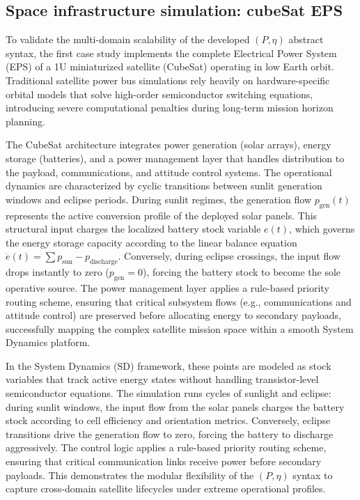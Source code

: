\documentclass[energies,accept,oneauthor,pdftex]{Definitions/mdpi}
\begin{document}
\subsection{Space infrastructure simulation: cubeSat EPS}
To validate the multi-domain scalability of the developed $(P, \eta)$ abstract syntax, the first case study implements the complete Electrical Power System (EPS) of a 1U miniaturized satellite (CubeSat) operating in low Earth orbit. Traditional satellite power bus simulations rely heavily on hardware-specific orbital models that solve high-order semiconductor switching equations, introducing severe computational penalties during long-term mission horizon planning.

The CubeSat architecture integrates power generation (solar arrays), energy storage (batteries), and a power management layer that handles distribution to the payload, communications, and attitude control systems. The operational dynamics are characterized by cyclic transitions between sunlit generation windows and eclipse periods. During sunlit regimes, the generation flow $p_{\text{gen}}(t)$ represents the active conversion profile of the deployed solar panels. This structural input charges the localized battery stock variable $e(t)$, which governs the energy storage capacity according to the linear balance equation $\dot{e}(t) = \sum p_{\text{sun}} - p_{\text{discharge}}$. Conversely, during eclipse crossings, the input flow drops instantly to zero ($p_{\text{gen}} = 0$), forcing the battery stock to become the sole operative source. The power management layer applies a rule-based priority routing scheme, ensuring that critical subsystem flows (e.g., communications and attitude control) are preserved before allocating energy to secondary payloads, successfully mapping the complex satellite mission space within a smooth System Dynamics platform.


In the System Dynamics (SD) framework, these points are modeled as stock variables that track active energy states without handling transistor-level semiconductor equations. The simulation runs cycles of sunlight and eclipse: during sunlit windows, the input flow from the solar panels charges the battery stock according to cell efficiency and orientation metrics. Conversely, eclipse transitions drive the generation flow to zero, forcing the battery to discharge aggressively. The control logic applies a rule-based priority routing scheme, ensuring that critical communication links receive power before secondary payloads. This demonstrates the modular flexibility of the $(P, \eta)$ syntax to capture cross-domain satellite lifecycles under extreme operational profiles.
\end{document}
